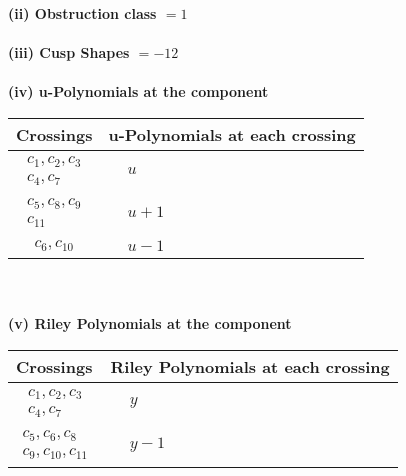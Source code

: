 \documentclass[1p]{elsarticle_modified}
\theoremstyle{definition}
\begin{document}
\flushleft \textbf{(ii) Obstruction class $= 1$}\\~\\
\flushleft \textbf{(iii) Cusp Shapes $= -12$}\\~\\
\newpage\renewcommand{\arraystretch}{1}
\flushleft \textbf{(iv) u-Polynomials at the component}\newline \\
\begin{tabular}{m{50pt}|m{274pt}}
Crossings & \hspace{64pt}u-Polynomials at each crossing \\
\hline $$\begin{aligned}c_{1},c_{2},c_{3}\\c_{4},c_{7}\end{aligned}$$&$\begin{aligned}
&u
\end{aligned}$\\
\hline $$\begin{aligned}c_{5},c_{8},c_{9}\\c_{11}\end{aligned}$$&$\begin{aligned}
&u+1
\end{aligned}$\\
\hline $$\begin{aligned}c_{6},c_{10}\end{aligned}$$&$\begin{aligned}
&u-1
\end{aligned}$\\
\hline
\end{tabular}\\~\\
\newpage\renewcommand{\arraystretch}{1}
\flushleft \textbf{(v) Riley Polynomials at the component}\newline \\
\begin{tabular}{m{50pt}|m{274pt}}
Crossings & \hspace{64pt}Riley Polynomials at each crossing \\
\hline $$\begin{aligned}c_{1},c_{2},c_{3}\\c_{4},c_{7}\end{aligned}$$&$\begin{aligned}
&y
\end{aligned}$\\
\hline $$\begin{aligned}c_{5},c_{6},c_{8}\\c_{9},c_{10},c_{11}\end{aligned}$$&$\begin{aligned}
&y-1
\end{aligned}$\\
\hline
\end{tabular}\\~\\
\end{document}
